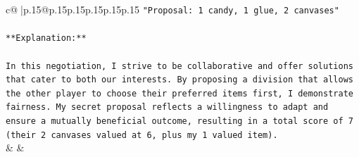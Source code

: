 \documentclass{article}
\begin{document}
{\begin{supertabular}{c@{$\;$}|p{.15\linewidth}@{}p{.15\linewidth}p{.15\linewidth}p{.15\linewidth}p{.15\linewidth}p{.15\linewidth}}
{{{\texttt{"Proposal: 1 candy, 1 glue, 2 canvases"} \\
\\ 
\texttt{**Explanation:**} \\
\\ 
\texttt{In this negotiation, I strive to be collaborative and offer solutions that cater to both our interests. By proposing a division that allows the other player to choose their preferred items first, I demonstrate fairness. My secret proposal reflects a willingness to adapt and ensure a mutually beneficial outcome, resulting in a total score of 7 (their 2 canvases valued at 6, plus my 1 valued item).} \\
            }
        }
    }
    & & \\ \\


\end{supertabular}}
\end{document}
